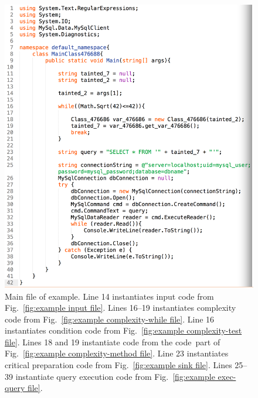 \documentclass[12pt]{article}
\begin{document}
\begin{figure}[htbp]
  \includegraphics[width=\linewidth]{fig_example_code1.png}
  \caption{Main file of example. Line 14 instantiates input code from 
    Fig.~\ref{fig:example input file}. Lines 16--19 instantiates complexity code from 
    Fig.~\ref{fig:example complexity-while file}. Line 16 instantiates condition code from
    Fig.~\ref{fig:example complexity-test file}.  Lines 18 and 19 instantiate code from the
    \texlangle code\texrangle\  part of Fig.~\ref{fig:example complexity-method file}.
    Line 23 instantiates critical preparation code from Fig.~\ref{fig:example sink file}.
    Lines 25--39 instantiate query execution code from Fig.~\ref{fig:example exec-query file}.
  }
  \label{fig:example main file}
\end{figure}
\end{document}
